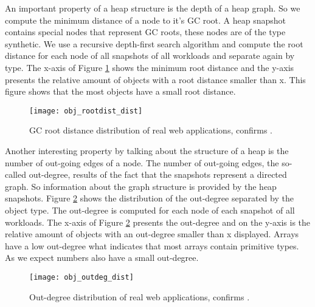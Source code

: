 An important property of a heap structure is the depth of a heap graph. So we compute the minimum distance of a node to it's GC root. A heap snapshot contains special nodes that represent GC roots, these nodes are of the type synthetic. We use a recursive depth-first search algorithm and compute the root distance for each node of all snapshots of all workloads and separate again by type. The x-axis of Figure \ref{fig:obj_rootdist_dist} shows the minimum root distance and the y-axis presents the relative amount of objects with a root distance smaller than x. This figure shows that the most objects have a small root distance.
\begin{figure}
	\centering
	\texttt{[image: obj\_rootdist\_dist]}
	\caption{GC root distance distribution of real web applications, confirms \cite{JSMeter2009}.}
	\label{fig:obj_rootdist_dist}
\end{figure}

Another interesting property by talking about the structure of a heap is the number of out-going edges of a node. The number of out-going edges, the so-called out-degree, results of the fact that the snapshots represent a directed graph. So information about the graph structure is provided by the heap snapshots. Figure \ref{fig:obj_outdeg_dist} shows the distribution of the out-degree separated by the object type. The out-degree is computed for each node of each snapshot of all workloads. The x-axis of Figure \ref{fig:obj_outdeg_dist} presents the out-degree and on the y-axis is the relative amount of objects with an out-degree smaller than x displayed. Arrays have a low out-degree what indicates that most arrays contain primitive types. As we expect numbers also have a small out-degree.
\begin{figure}
	\centering
	\texttt{[image: obj\_outdeg\_dist]}
	\caption{Out-degree distribution of real web applications, confirms \cite{JSMeter2009}.}
	\label{fig:obj_outdeg_dist}
\end{figure}

